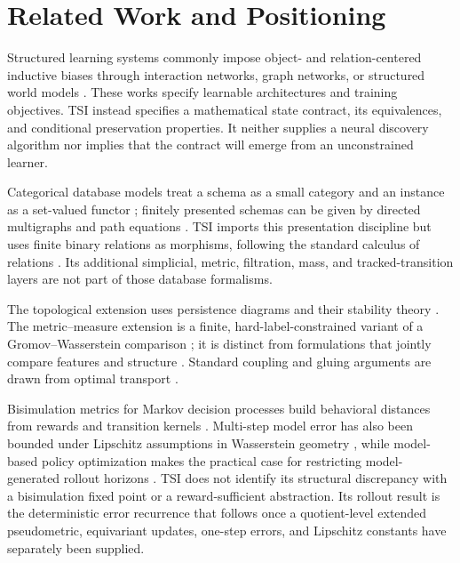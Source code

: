 \section{Related Work and Positioning}

Structured learning systems commonly impose object- and relation-centered
inductive biases through interaction networks, graph networks, or structured
world models \cite{battaglia2016interaction,battaglia2018relational,
kipf2020contrastive}. These works specify learnable architectures and training
objectives. TSI instead specifies a mathematical state contract, its
equivalences, and conditional preservation properties. It neither supplies a
neural discovery algorithm nor implies that the contract will emerge from an
unconstrained learner.

Categorical database models treat a schema as a small category and an instance
as a set-valued functor \cite{maclane1998categories,spivak2012functorial};
finitely presented schemas
can be given by directed multigraphs and path equations
\cite{spivakwisnesky2015relational}. TSI imports this presentation discipline
but uses finite binary relations as morphisms, following the standard calculus
of relations \cite{freydscedrov1990categories}. Its additional simplicial,
metric, filtration, mass, and tracked-transition layers are not part of those
database formalisms.

The topological extension uses persistence diagrams and their stability theory
\cite{edelsbrunner2002topological,zomorodian2005computing,
cohensteiner2007stability,chazal2009proximity,bauerlesnick2015induced,
crawleyboevey2015decomposition}. The metric--measure extension is
a finite, hard-label-constrained variant of a Gromov--Wasserstein comparison
\cite{memoli2011gromov}; it is distinct from formulations that jointly compare
features and structure \cite{vayer2020fused}. Standard coupling and gluing
arguments are drawn from optimal transport
\cite{villani2009optimal,peyre2019computational}.

Bisimulation metrics for Markov decision processes build behavioral distances
from rewards and transition kernels \cite{ferns2004metrics}. Multi-step model
error has also been bounded under Lipschitz assumptions in Wasserstein geometry
\cite{asadi2018lipschitz}, while model-based policy optimization makes the
practical case for restricting model-generated rollout horizons
\cite{janner2019trust}. TSI does not identify its structural discrepancy with
a bisimulation fixed point or a reward-sufficient abstraction. Its rollout
result is the deterministic error recurrence that follows once a quotient-level
extended pseudometric, equivariant updates, one-step errors, and Lipschitz
constants have separately been supplied.
